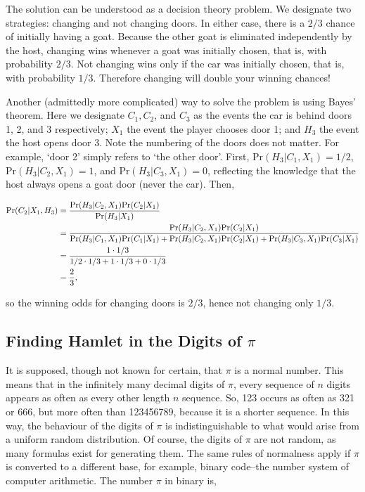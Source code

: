 \documentclass[11pt]{amsart}
\begin{document}
The solution can be understood as a decision theory problem. We designate two strategies: changing and not changing doors. In either case, there is a $2/3$ chance of initially having a goat. Because the other goat is eliminated independently by the host, changing wins whenever a goat was initially chosen, that is, with probability $2/3$. Not changing wins only if the car was initially chosen, that is, with probability $1/3$. Therefore changing will double your winning chances!

Another (admittedly more complicated) way to solve the problem is using Bayes' theorem. Here we designate $C_1, C_2$, and $C_3$ as the events the car is behind doors 1, 2, and 3 respectively; $X_1$ the event the player chooses door 1; and $H_3$ the event the host opens door 3. Note the numbering of the doors does not matter. For example, `door 2' simply refers to `the other door'. First, $\text{Pr}(H_3|C_1,X_1) = 1/2$, $\text{Pr}(H_3|C_2,X_1) = 1$, and $\text{Pr}(H_3|C_3,X_1) = 0$, reflecting the knowledge that the host always opens a goat door (never the car). Then,

\begin{align}
\text{Pr}(C_2|X_1,H_3) &= \frac{\text{Pr}(H_3|C_2,X_1)\text{Pr}(C_2|X_1)}{\text{Pr}(H_3|X_1)} \notag \\
&= \frac{\text{Pr}(H_3|C_2,X_1)\text{Pr}(C_2|X_1)}{\text{Pr}(H_3|C_1,X_1)\text{Pr}(C_1|X_1) + \text{Pr}(H_3|C_2,X_1)\text{Pr}(C_2|X_1) + \text{Pr}(H_3|C_3,X_1)\text{Pr}(C_3|X_1)} \notag \\
&= \frac{1 \cdot 1/3}{1/2 \cdot 1/3 + 1 \cdot 1/3 + 0 \cdot 1/3} \notag \\
&= \frac{2}{3}, \notag
\end{align}

so the winning odds for changing doors is $2/3$, hence not changing only $1/3$.

\subsection{Finding Hamlet in the Digits of $\pi$}

It is supposed, though not known for certain, that $\pi$ is a normal number. This means that in the infinitely many decimal digits of $\pi$, every sequence of $n$ digits appears as often as every other length $n$ sequence. So, 123 occurs as often as 321 or 666, but more often than 123456789, because it is a shorter sequence. In this way, the behaviour of the digits of $\pi$ is indistinguishable to what would arise from a uniform random distribution. Of course, the digits of $\pi$ are not random, as many formulas exist for generating them. The same rules of normalness apply if $\pi$ is converted to a different base, for example, binary code--the number system of computer arithmetic. The number $\pi$ in binary is,
\end{document}
